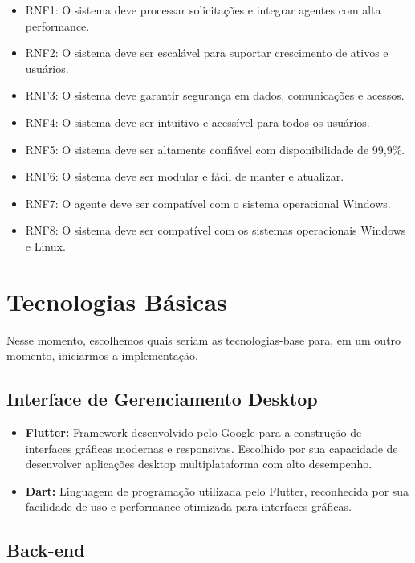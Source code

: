 \begin{itemize}
    \item RNF1: O sistema deve processar solicitações e integrar agentes com alta performance.
    \item RNF2: O sistema deve ser escalável para suportar crescimento de ativos e usuários.
    \item RNF3: O sistema deve garantir segurança em dados, comunicações e acessos.
    \item RNF4: O sistema deve ser intuitivo e acessível para todos os usuários.
    \item RNF5: O sistema deve ser altamente confiável com disponibilidade de 99,9\%.
    \item RNF6: O sistema deve ser modular e fácil de manter e atualizar.
    \item RNF7: O agente deve ser compatível com o sistema operacional Windows.
    \item RNF8: O sistema deve ser compatível com os sistemas operacionais Windows e Linux.
\end{itemize}



\section{Tecnologias Básicas}

Nesse momento, escolhemos quais seriam as tecnologias-base para, em um outro momento, iniciarmos a implementação.

\subsection{Interface de Gerenciamento Desktop}

\begin{itemize}
    \item \textbf{Flutter:} Framework desenvolvido pelo Google para a construção de interfaces gráficas modernas e responsivas. Escolhido por sua capacidade de desenvolver aplicações desktop multiplataforma com alto desempenho.
    \item \textbf{Dart:} Linguagem de programação utilizada pelo Flutter, reconhecida por sua facilidade de uso e performance otimizada para interfaces gráficas.
\end{itemize}

\subsection{Back-end}

